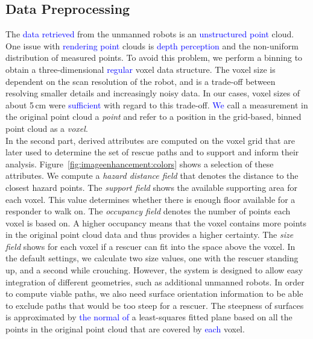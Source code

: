 \documentclass{egpubl}
\newcommand{\diff}[1]{\textcolor{blue}{#1}}
\begin{document}
\subsection{Data Preprocessing} \label{sec:overview:preprocessing}
The \diff{data retrieved} from the unmanned robots is an \diff{unstructured point} cloud. One issue with \diff{rendering point} clouds is \diff{depth perception} and the non-uniform distribution of measured points. To avoid this problem, we perform a binning to obtain a three-dimensional \diff{regular} voxel data structure. The voxel size is dependent on the scan resolution of the robot, and is a trade-off between resolving smaller details and increasingly noisy data. In our cases, voxel sizes of about 5\,cm were \diff{sufficient} with regard to this trade-off. \diff{We} call a measurement in the original point cloud a \emph{point} and refer to a position in the grid-based, binned point cloud as a \emph{voxel}.\\
%
 In the second part, derived attributes are computed on the voxel grid that are later used to determine the set of rescue paths and to support and inform their analysis. Figure~\ref{fig:imageenhancement:colors} shows a selection of these attributes. We compute a \emph{hazard distance field} that denotes the distance to the closest hazard points. The \emph{support field} shows the available supporting area for each voxel. This value determines whether there is enough floor available for a responder to walk on. The \emph{occupancy field} denotes the number of points each voxel is based on. A higher occupancy means that the voxel contains more points in the original point cloud data and thus provides a higher certainty. The \emph{size field} shows for each voxel if a rescuer can fit into the space above the voxel. In the default settings, we calculate two size values, one with the rescuer standing up, and a second while crouching. However, the system is designed to allow easy integration of different geometries, such as additional unmanned robots. In order to compute viable paths, we also need surface orientation information to be able to exclude paths that would be too steep for a rescuer. The steepness of surfaces is approximated by \diff{the normal of} a least-squares fitted plane based on all the points in the original point cloud that are covered by \diff{each} voxel.
\end{document}
